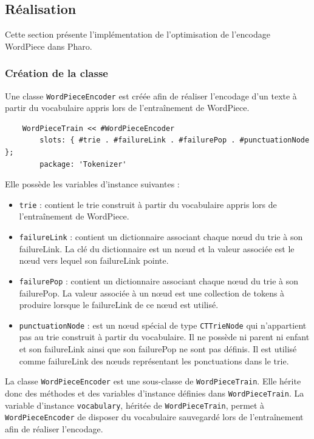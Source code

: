 \documentclass[12pt,a4paper]{report}
\begin{document}
	\subsection{Réalisation}
	
	Cette section présente l’implémentation de l’optimisation de l’encodage WordPiece dans Pharo.
	
	\subsubsection{Création de la classe}
	Une classe \texttt{WordPieceEncoder} est créée afin de réaliser l’encodage d’un texte à partir du vocabulaire appris lors de l’entraînement de WordPiece.
	
	\begin{verbatim}
	WordPieceTrain << #WordPieceEncoder
		slots: { #trie . #failureLink . #failurePop . #punctuationNode };
		package: 'Tokenizer'
	\end{verbatim}
	
	Elle possède les variables d’instance suivantes :
	
	\begin{itemize}
		\item \texttt{trie} : contient le trie construit à partir du vocabulaire appris lors de l’entraînement de WordPiece.
		
		\item \texttt{failureLink} : contient un dictionnaire associant chaque nœud du trie à son failureLink. La clé du dictionnaire est un nœud et la valeur associée est le nœud vers lequel son failureLink pointe.
		
		\item \texttt{failurePop} : contient un dictionnaire associant chaque nœud du trie à son failurePop. La valeur associée à un nœud est une collection de tokens à produire lorsque le failureLink de ce nœud est utilisé.
		
		\item \texttt{punctuationNode} : est un nœud spécial de type \texttt{CTTrieNode} qui n'appartient pas au trie construit à partir du vocabulaire. Il ne possède ni parent ni enfant et son failureLink ainsi que son failurePop ne sont pas définis. Il est utilisé comme failureLink des nœuds représentant les ponctuations dans le trie.
	\end{itemize}
	
	La classe \texttt{WordPieceEncoder} est une sous-classe de \texttt{WordPieceTrain}. Elle hérite donc des méthodes et des variables d’instance définies dans \texttt{WordPieceTrain}. La variable d’instance \texttt{vocabulary}, héritée de \texttt{WordPieceTrain}, permet à \texttt{WordPieceEncoder} de disposer du vocabulaire sauvegardé lors de l’entraînement afin de réaliser l’encodage.
	
\end{document}
